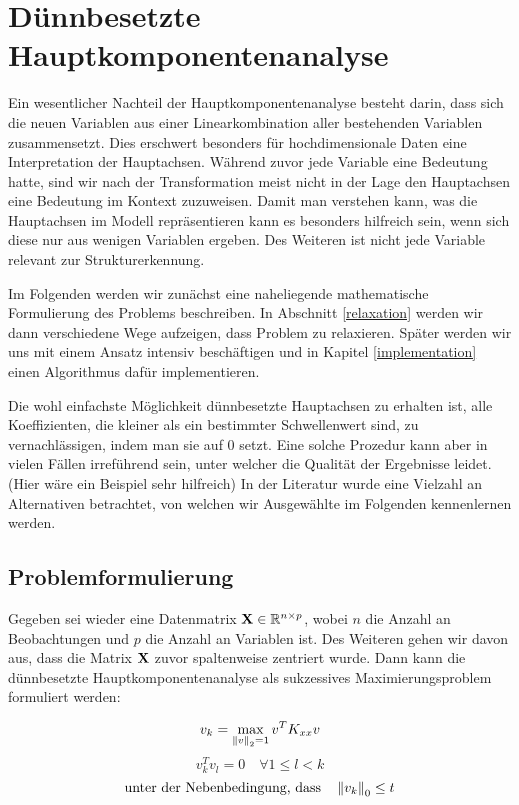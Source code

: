 \chapter{Dünnbesetzte Hauptkomponentenanalyse}

\label{sparse_pca}

Ein wesentlicher Nachteil der Hauptkomponentenanalyse besteht darin, dass sich die neuen Variablen aus einer Linearkombination aller bestehenden Variablen zusammensetzt. Dies erschwert besonders für hochdimensionale Daten eine Interpretation der Hauptachsen. Während zuvor jede Variable eine Bedeutung hatte, sind wir nach der Transformation meist nicht in der Lage den Hauptachsen eine Bedeutung im Kontext zuzuweisen. Damit man verstehen kann, was die Hauptachsen im Modell repräsentieren kann es besonders hilfreich sein, wenn sich diese nur aus wenigen Variablen ergeben. Des Weiteren ist nicht jede Variable relevant zur Strukturerkennung.

Im Folgenden werden wir zunächst eine naheliegende mathematische Formulierung des Problems beschreiben. In Abschnitt \ref{relaxation} werden wir dann verschiedene Wege aufzeigen, dass Problem zu relaxieren. Später werden wir uns mit einem Ansatz intensiv beschäftigen und in Kapitel \ref{implementation} einen Algorithmus dafür implementieren. 

Die wohl einfachste Möglichkeit dünnbesetzte Hauptachsen zu erhalten ist, alle Koeffizienten, die kleiner als ein bestimmter Schwellenwert sind, zu vernachlässigen, indem man sie auf 0 setzt. Eine solche Prozedur kann aber in vielen Fällen irreführend sein, unter welcher die Qualität der Ergebnisse leidet. (Hier wäre ein Beispiel sehr hilfreich) In der Literatur wurde eine Vielzahl an Alternativen betrachtet, von welchen wir Ausgewählte im Folgenden kennenlernen werden.

\section{Problemformulierung} \label{problem_formulation}
Gegeben sei wieder eine Datenmatrix $\mathbf{X} \in \mathbb{R}^{n \times p}$, wobei $n$ die Anzahl an Beobachtungen und $p$ die Anzahl an Variablen ist. Des Weiteren gehen wir davon aus, dass die Matrix $\mathbf{X}$ zuvor spaltenweise zentriert wurde. Dann kann die dünnbesetzte Hauptkomponentenanalyse als sukzessives Maximierungsproblem formuliert werden:

$$v_{k} = \max_{\left\lVert v \right\rVert_2 = 1} v^{T}K_{xx} v$$
$$v_{k}^Tv_{l} = 0 \quad \forall 1 \leq l < k$$
$${\text{unter der Nebenbedingung, dass}}\quad \left\lVert v_{k} \right\rVert_0 \leq t$$

